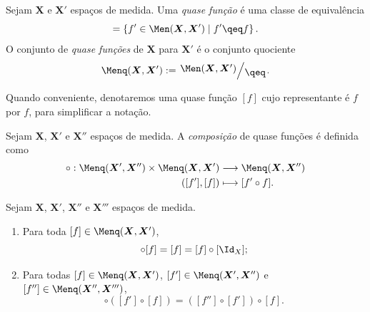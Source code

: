 \begin{defi}
Sejam $\bm X$ e $\bm X'$ espaços de medida. Uma \emph{quase função} é uma classe de equivalência
	\begin{equation*}
	[f] = \set{f' \in \Men(\bm X, \bm X')}{f' \qeq f}.
	\end{equation*}
O conjunto de \emph{quase funções} de $\bm X$ para $\bm X'$ é o conjunto quociente
	\begin{equation*}
	\Menq(\bm X, \bm X') := \quo{\Men(\bm X, \bm X')}{\qeq}.
	\end{equation*}
\end{defi}

Quando conveniente, denotaremos uma quase função $[f]$ cujo representante é $f$ por $f$, para simplificar a notação.

\begin{defi}
Sejam $\bm X$, $\bm X'$ e $\bm X''$ espaços de medida. A \emph{composição} de quase funções é definida como
	\begin{align*}
	\func{\circ}{\Menq(\bm X', \bm X'') \times \Menq(\bm X, \bm X')}{\Menq(\bm X, \bm X'')}{([f'],[f])}{[f' \circ f]}.
	\end{align*}
\end{defi}

\begin{prop}
Sejam $\bm X$, $\bm X'$, $\bm X''$ e $\bm X'''$ espaços de medida.
	\begin{enumerate}
	\item Para toda $[f] \in \Menq(\bm X, \bm X')$,
		\begin{equation*}
		[\Id_{X'}] \circ [f] = [f] = [f] \circ [\Id_X];
		\end{equation*}
	\item Para todas $[f] \in \Menq(\bm X, \bm X')$, $[f'] \in \Menq(\bm X', \bm X'')$ e $[f''] \in \Menq(\bm X'', \bm X''')$,
		\begin{equation*}
		[f''] \circ ([f'] \circ [f]) = ([f''] \circ [f']) \circ [f].
		\end{equation*}
	\end{enumerate}
\end{prop}



























